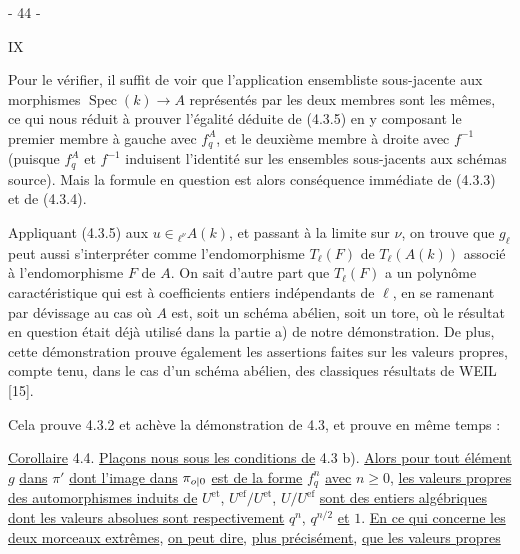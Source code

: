 \begin{center}- 44 -\end{center}\hfill IX

Pour le vérifier, il suffit de voir que l'application ensembliste sous-jacente aux morphismes $\operatorname{Spec}(k)\longrightarrow A$ représentés par les deux membres sont les mêmes, ce qui nous réduit à prouver l'égalité déduite de (4.3.5) en y composant le premier membre à gauche avec $f_q^A$, et le deuxième membre à droite avec $f^{-1}$ (puisque $f_q^A$ et $f^{-1}$ induisent l'identité sur les ensembles sous-jacents aux schémas source). Mais la formule en question est alors conséquence immédiate de (4.3.3) et de (4.3.4).

Appliquant (4.3.5) aux $u\in{}_{\ell^\nu}A(k)$, et passant à la limite sur $\nu$, on trouve que $g_\ell$ peut aussi s'interpréter comme l'endomorphisme $T_\ell(F)$ de $T_\ell(A(k))$ associé à l'endomorphisme $F$ de $A$. On sait d'autre part que $T_\ell(F)$ a un polynôme caractéristique qui est à coefficients entiers indépendants de $\ell$, en se ramenant par dévissage au cas où $A$ est, soit un schéma abélien, soit un tore, où le résultat en question était déjà utilisé dans la partie a) de notre démonstration. De plus, cette démonstration prouve également les assertions faites sur les valeurs propres, compte tenu, dans le cas d'un schéma abélien, des classiques résultats de WEIL [15].

Cela prouve 4.3.2 et achève la démonstration de 4.3, et prouve en même temps :

\uline{Corollaire} 4.4. \uline{Plaçons nous sous les conditions de} 4.3 b). \uline{Alors pour tout élément} $g$ \uline{dans} $\pi'$ \uline{dont l'image dans} $\pi_{{o|0}}$ \uline{est de la forme} $f_q^n$ \uline{avec} $n\geq0$, \uline{les valeurs propres des automorphismes induits de} $U^{\mathrm{et}}$, $U^{\mathrm{ef}}/U^{\mathrm{et}}$, $U/U^{\mathrm{ef}}$ \uline{sont des entiers algébriques dont les valeurs absolues sont respectivement} $q^n$, $q^{n/2}$ \uline{et} $1$. \uline{En ce qui concerne les deux morceaux extrêmes}, \uline{on peut dire}, \uline{plus précisément}, \uline{que les valeurs propres}
